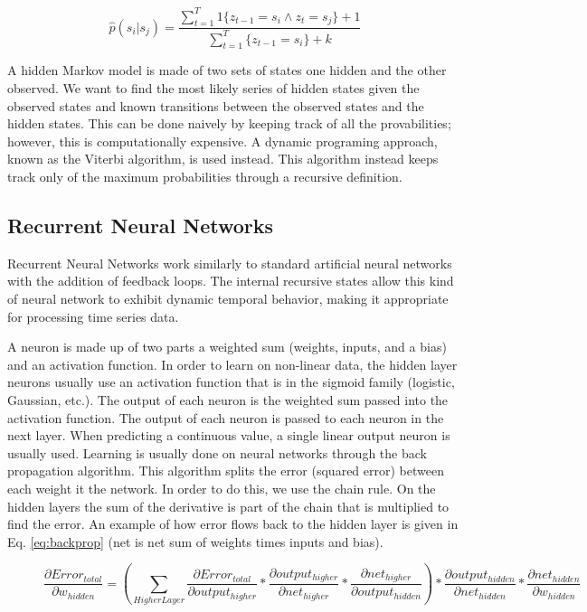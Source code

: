 \documentclass[twoside]{article}
\begin{document}
\begin{multicols}{2}
\begin{equation}
\hat{p}({s_{i}|s_{j}}) = \frac{\sum_{t=1}^{T}1\{z_{t-1} = s_{i} \wedge z_{t} = s_{j}\}+1}{\sum _{t=1}^{T}\{ z_{t-1} = s_{i}\} + k}
\label{eq:hmmlaplace}
\end{equation}

A hidden Markov model is made of two sets of states one hidden and the other observed. We want to find the most likely series of hidden states given the observed states and known transitions between the observed states and the hidden states. This can be done naively by keeping track of all the provabilities; however, this is computationally expensive. A dynamic programing approach, known as the Viterbi algorithm, is used instead. This algorithm instead keeps track only of the maximum probabilities through a recursive definition.



\subsection{Recurrent Neural Networks}
\indent \indent Recurrent Neural Networks work similarly to standard artificial neural networks with the addition of feedback loops. The internal recursive states allow this kind of neural network to exhibit dynamic temporal behavior, making it appropriate for processing time series data.

\indent A neuron is made up of two parts a weighted sum (weights, inputs, and a bias) and an activation function. In order to learn on non-linear data, the hidden layer neurons usually use an activation function that is in the sigmoid family (logistic, Gaussian, etc.). The output of each neuron is the weighted sum passed into the activation function. The output of each neuron is passed to each neuron in the next layer. When predicting a continuous value, a single linear output neuron is usually used. Learning is usually done on neural networks through the back propagation algorithm. This algorithm splits the error (squared error) between each weight it the network. In order to do this, we use the chain rule. On the hidden layers the sum of the derivative is part of the chain that is multiplied to find the error. An example of how error flows back to the hidden layer is given in Eq. \ref{eq:backprop} (net is net sum of weights times inputs and bias).

\begin{figure}[!t]
\begin{center}
\begin{equation}
\frac{\partial Error_{total}}{\partial w_{hidden}} = \left ( \sum_{Higher Layer}\frac{\partial Error_{total}}{\partial output_{higher}}*\frac{\partial output_{higher}}{\partial net_{higher}}*\frac{\partial net_{higher}}{\partial output_{hidden}} \right )*\frac{\partial output_{hidden}}{\partial net_{hidden}}*\frac{\partial net_{hidden}}{\partial w_{hidden}}
\label{eq:backprop}
\end{equation}
\vspace*{4pt}
\end{center}
\end{figure}






\end{multicols}
\end{document}

